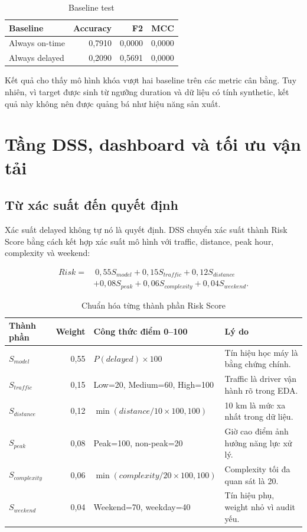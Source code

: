 \documentclass[12pt,a4paper,oneside]{report}
\begin{document}
\begin{table}[H]
\centering
\caption{Baseline test}
\begin{tabular}{lrrr}
\toprule
Baseline & Accuracy & F2 & MCC\\
\midrule
Always on-time & 0,7910 & 0,0000 & 0,0000\\
Always delayed & 0,2090 & 0,5691 & 0,0000\\
\bottomrule
\end{tabular}
\end{table}

Kết quả cho thấy mô hình khóa vượt hai baseline trên các metric cân bằng. Tuy
nhiên, vì target được sinh từ ngưỡng duration và dữ liệu có tính synthetic, kết
quả này không nên được quảng bá như hiệu năng sản xuất.

\chapter{Tầng DSS, dashboard và tối ưu vận tải}

\section{Từ xác suất đến quyết định}

Xác suất delayed không tự nó là quyết định. DSS chuyển xác suất thành Risk
Score bằng cách kết hợp xác suất mô hình với traffic, distance, peak hour,
complexity và weekend:

\[
\begin{aligned}
Risk =&\ 0,55S_{model} + 0,15S_{traffic} + 0,12S_{distance}\\
&+ 0,08S_{peak} + 0,06S_{complexity} + 0,04S_{weekend}.
\end{aligned}
\]

\begin{table}[H]
\centering
\caption{Chuẩn hóa từng thành phần Risk Score}
\small
\begin{tabularx}{\linewidth}{lrlX}
\toprule
Thành phần & Weight & Công thức điểm 0--100 & Lý do\\
\midrule
\(S_{model}\) & 0,55 & \(P(delayed)\times100\) & Tín hiệu học máy là bằng chứng chính.\\
\(S_{traffic}\) & 0,15 & Low=20, Medium=60, High=100 & Traffic là driver vận hành rõ trong EDA.\\
\(S_{distance}\) & 0,12 & \(\min(distance/10\times100,100)\) & 10 km là mức xa nhất trong dữ liệu.\\
\(S_{peak}\) & 0,08 & Peak=100, non-peak=20 & Giờ cao điểm ảnh hưởng năng lực xử lý.\\
\(S_{complexity}\) & 0,06 & \(\min(complexity/20\times100,100)\) & Complexity tối đa quan sát là 20.\\
\(S_{weekend}\) & 0,04 & Weekend=70, weekday=40 & Tín hiệu phụ, weight nhỏ vì audit yếu.\\
\bottomrule
\end{tabularx}
\end{table}
\end{document}
